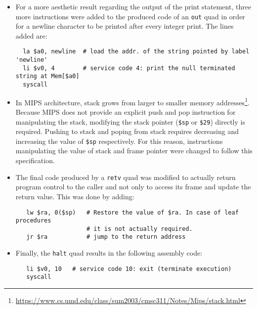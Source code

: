 \documentclass{article}
\newcommand{\pythonscript}[2]{
\begin{itemize}
\item[]
\end{itemize}
}
\def\code#1{\texttt{#1}} %
\begin{document}
\begin{itemize}
 \item For a more aesthetic result regarding the output of the print statement, three more instructions
       were added to the produced code of an \code{out} quad in order for a newline character to be printed
       after every integer print. The lines added are:
  \begin{lstlisting}
  la $a0, newline  # load the addr. of the string pointed by label 'newline'
  li $v0, 4        # service code 4: print the null terminated string at Mem[$a0]
  syscall
  \end{lstlisting}
 \item In MIPS architecture, stack grows from larger to smaller memory
       addresses\footnote{\url{https://www.cs.umd.edu/class/sum2003/cmsc311/Notes/Mips/stack.html}}.
       Because MIPS does not provide an explicit push and pop instruction for manipulating the stack,
       modifying the stack pointer (\verb|$sp| or \verb|$29|) directly is required. Pushing to stack
       and poping from stack requires decreasing and increasing the value of \verb|$sp| respectively.
       For this reason, instructions manipulating the value of stack and frame pointer were changed
       to follow this specification.
 \item The final code produced by a \code{retv} quad was modified to actually return
       program control to the caller and not only to access its frame and update the return value.
       This was done by adding:
  \begin{lstlisting}
   lw $ra, 0($sp)   # Restore the value of $ra. In case of leaf procedures
                    # it is not actually required.
   jr $ra           # jump to the return address
  \end{lstlisting}
 \item Finally, the \code{halt} quad results in the following assembly code:
 \begin{lstlisting}
   li $v0, 10   # service code 10: exit (terminate execution)
   syscall
  \end{lstlisting}
\end{itemize}





\end{document}
